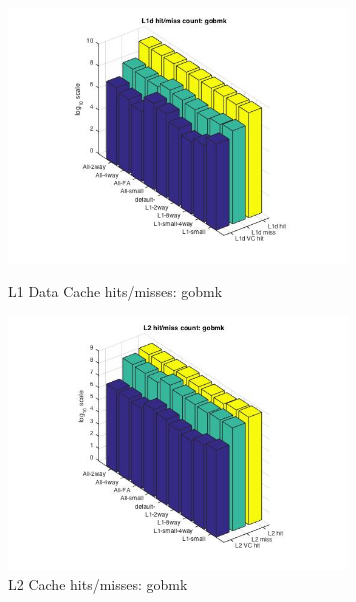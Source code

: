 \documentclass[11pt,titlepage]{article}
\begin{document}
        \begin{figure}[H]
          \centering
          \begin{minipage}{.45\textwidth}
            \includegraphics[width=9cm]{L1DHM_gobmk}
            \caption{L1 Data Cache hits/misses: gobmk}
            \label{fig:L1DHM_gobmk}
          \end{minipage}
          \begin{minipage}{.45\textwidth}
            \includegraphics[width=9cm]{L2HM_gobmk}
            \caption{L2 Cache hits/misses: gobmk}
            \label{fig:L2HM_gobmk}
          \end{minipage}
    \end{figure}
\end{document}
